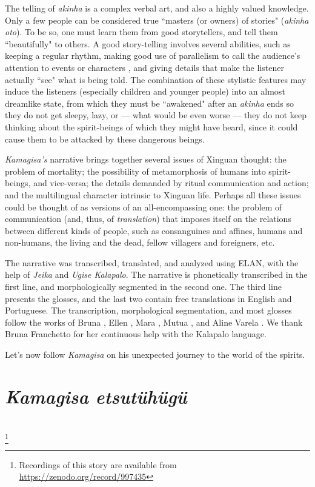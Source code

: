 \documentclass[output=paper,
modfonts,nonflat
]{langsci/langscibook}
\begin{document}
    The telling of \textit{akinha} is a complex verbal art, and also a highly valued knowledge. Only a few people can be considered true “masters (or owners) of stories" (\textit{akinha oto}). To be so, one must learn them from good storytellers, and tell them “beautifully" to others. A good story-telling involves several abilities, such as keeping a regular rhythm, making good use of parallelism to call the audience's attention to events or characters \citep{Franchetto2003}, and giving details that make the listener actually “see" what is being told. The combination of these stylistic features may induce the listeners (especially children and younger people) into an almost dreamlike state, from which they must be “awakened" after an \textit{akinha} ends so they do not get sleepy, lazy, or — what would be even worse — they do not keep thinking about the spirit-beings of which they might have heard, since it could cause them to be attacked by these dangerous beings.

\newpage     
    \textit{Kamagisa's} narrative brings together several issues of Xinguan thought: the problem of mortality; the possibility of metamorphosis of humans into spirit-beings, and vice-versa; the details demanded by ritual communication and action; and the multilingual character intrinsic to Xinguan life. Perhaps all these issues could be thought of as versions of an all-encompassing one: the problem of communication (and, thus, of \textit{translation}) that imposes itself on the relations between different kinds of people, such as consanguines and affines, humans and non-humans, the living and the dead, fellow villagers and foreigners, etc.
          
    The narrative was transcribed, translated, and analyzed using ELAN, with the help of \textit{Jeika} and \textit{Ugise Kalapalo}. The narrative is phonetically transcribed in the first line, and morphologically segmented in the second one. The third line presents the glosses, and the last two contain  free translations in English and Portuguese. The transcription, morphological segmentation, and most glosses follow the works of Bruna \citet{Franchetto1986,Franchetto2002,Franchetto2003}, Ellen \citet{Basso2012}, Mara \citet{Santos2007}, Mutua \citet{Mehinaku2010}, and Aline Varela \citet{Rabello2013}. We thank Bruna Franchetto for her continuous help with the Kalapalo language.

    Let's now follow \textit{Kamagisa} on his unexpected journey to the world of the spirits.

\section{\textit{Kamagisa etsutühügü}}
\\
\footnote{Recordings of this story are available from \url{https://zenodo.org/record/997435}}
\end{document}
